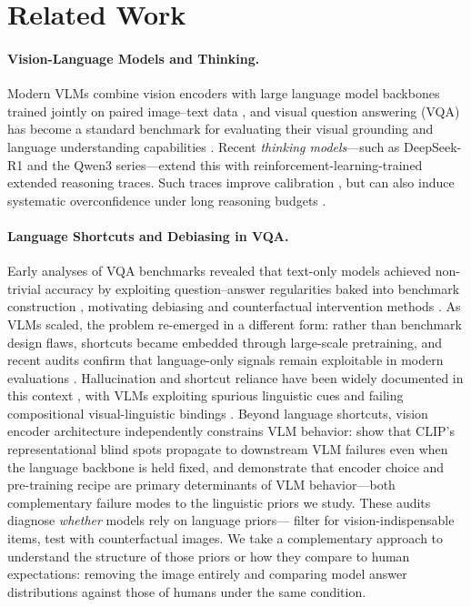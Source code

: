 \documentclass[letterpaper]{article}
\begin{document}
\section{Related Work}

\paragraph{Vision-Language Models and Thinking.}
Modern VLMs combine vision encoders with large language model backbones trained
jointly on paired image--text data \citep{liu2023visual,zhang2023multimodal}, and
visual question answering (VQA) has become a standard benchmark for evaluating their
visual grounding and language understanding capabilities \citep{antol2015vqa,goyal2016making}.
Recent \emph{thinking models}---such as DeepSeek-R1 \citep{deepseekai2025deepseekr1}
and the Qwen3 series---extend this with reinforcement-learning-trained extended
reasoning traces. Such traces improve calibration \citep{yoon2025reasoningconfidence}, but can also induce systematic overconfidence under long reasoning budgets \citep{lacombe2025dontthink}.

\paragraph{Language Shortcuts and Debiasing in VQA.}
Early analyses of VQA benchmarks revealed that text-only models achieved
non-trivial accuracy by exploiting question--answer regularities baked into
benchmark construction \citep{jabri2016revisiting,zhang2016yin,agrawal2018dont},
motivating debiasing and counterfactual intervention methods
\citep{cadene2019rubi,clark2019dont,teney2020learning,niu2021counterfactual}. As VLMs scaled, the problem re-emerged in a
different form: rather than benchmark design flaws, shortcuts became embedded
through large-scale pretraining, and recent audits confirm that language-only
signals remain exploitable in modern evaluations \citep{chen2024are,lee2024vlind}.
Hallucination and shortcut reliance have been widely documented in this context
\citep{ji2023survey,rohrbach2018object,xiao2021hallucination,li2023evaluating,huang2024opera}, with VLMs
exploiting spurious linguistic cues \citep{han2024instinctive,ye2024mmspubench}
and failing compositional visual-linguistic bindings \citep{yuksekgonul2023when}.
Beyond language shortcuts, vision encoder architecture independently constrains VLM behavior: \citet{tong2024eyes} show that CLIP's representational blind spots propagate to downstream VLM failures even when the language backbone is held fixed, and \citet{mckinzie2024mm1} demonstrate that encoder choice and pre-training recipe are primary determinants of VLM behavior---both complementary failure modes to the linguistic priors we study.
These audits diagnose \emph{whether} models rely on language priors---\citet{chen2024are}
filter for vision-indispensable items, \citet{lee2024vlind} test with counterfactual
images. We take a complementary approach to understand the structure of those priors or how they compare to human expectations: removing the image
entirely and comparing model answer distributions against those of humans under the same condition.
\end{document}

